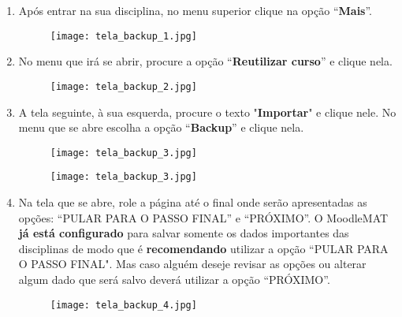 \documentclass[12pt]{report}
\begin{document}
\begin{enumerate}[\bf 1)]
    \item Ap\'os entrar na sua disciplina, no menu superior clique na opção ``\textbf{Mais}''.
	\begin{figure}[H]
    	\centering
    	\hspace*{-2.5cm}\texttt{[image: tela\_backup\_1.jpg]}
  	\end{figure}

	\newpage

        \item No menu que irá se abrir, procure a opção ``\textbf{Reutilizar curso}'' e clique nela.
	\begin{figure}[H]
	   \centering
        	\hspace*{-2.5cm}\texttt{[image: tela\_backup\_2.jpg]}
	    \end{figure}
	
	\newpage

	\item A tela seguinte, à sua esquerda, procure o texto "\textbf{Importar}" e clique nele. No menu que se abre escolha a opção ``\textbf{Backup}'' e clique nela.
	\begin{figure}[H]
    	\centering
    	\hspace*{-2.5cm}\texttt{[image: tela\_backup\_3.jpg]}
  	\end{figure}
	
	\begin{figure}[H]
    	\centering
    	\hspace*{-2.5cm}\texttt{[image: tela\_backup\_3.jpg]}
  	\end{figure}

  	\newpage

	\item Na tela que se abre, role a página at\'e o final onde ser\~ao apresentadas as op\c{c}\~oes: ``PULAR PARA O PASSO FINAL'' e ``PR\'OXIMO''. O MoodleMAT \textbf{j\'a est\'a configurado} para salvar somente os dados importantes das disciplinas de modo que \'e \textbf{recomendando} utilizar a op\c{c}\~ao ``PULAR PARA O PASSO FINAL". Mas caso algu\'em deseje revisar as op\c{c}\~oes ou alterar algum dado que ser\'a salvo dever\'a utilizar a op\c{c}\~ao ``PR\'OXIMO''.
	\begin{figure}[H]
    	\centering
    	\hspace*{-2.5cm}\texttt{[image: tela\_backup\_4.jpg]}
  	\end{figure}


\end{enumerate}
\end{document}
